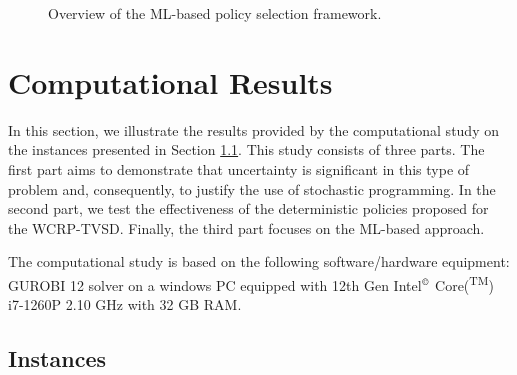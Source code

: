 \documentclass[preprint,11pt,authoryear]{elsarticle}
\begin{document}
\begin{figure}[h]
{
}%
\caption{Overview of the ML-based policy selection framework.} 
\label{fig:framework}
\end{figure}

\section{Computational Results}\label{results}
In this section, we illustrate the results provided by the computational study on the instances presented in Section \ref{instances}. This study consists of three parts. The first part aims to demonstrate that uncertainty is significant in this type of problem and, consequently, to justify the use of stochastic programming. In the second part, we test the effectiveness of the deterministic policies proposed for the WCRP-TVSD. Finally, the third part focuses on the ML-based approach.

The computational study is based on the following software/hardware equipment: GUROBI 12 solver on a windows PC equipped with 12th Gen Intel$^{\copyright}$ Core(\textsuperscript{TM}) i7-1260P   2.10 GHz with 32 GB RAM.

\subsection{Instances}\label{instances}
\end{document}
